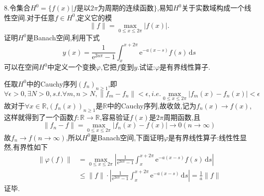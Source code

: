 \documentclass[titlepage,11pt,a4paper,twoside]{report}
\makeatletter
\newcommand\diff{\,\mathrm{d}}
\newcommand\e{\mathrm{e}}
\renewenvironment{proof}{\par
	\pushQED{\qed}%
	\normalfont \topsep1\p@\@plus6\p@\relax
	\trivlist
	\item\relax
	{\hspace*{\parindent}{\heiti 证明}\@addpunct{:}}\hspace\labelsep\ignorespaces
}{%
	\popQED\endtrivlist\@endpefalse
}
\makeatother
\begin{document}
8.令集合$H^0=\{f(x)|f\mbox{是以}2\pi\mbox{为周期的连续函数}\}$,易知$H^0$关于实数域构成一个线性空间.对于任意$f\in H^0$,定义它的模
\[\|f\|=\max_{0\leq x\leq 2\pi}|f(x)|.\]
证明$H^0$是Banach空间,利用下式
\[y(x)=\frac{1}{\e^{2a\pi}-1}\int_x^{x+2\pi}\e^{-a(x-s)}f(s)\diff s\]
可以在空间$H^0$中定义一个变换$\varphi$,它把$f$变到$y$.试证:$\varphi$是有界线性算子.
\begin{proof}任取$H^0$中的Cauchy序列$(f_n)_{n\geq1}$,即
\[\forall\epsilon>0,\exists N>0,s.t.\forall m,n>N,\|f_m-f_n\|<\epsilon,i.e.\max_{0\leq x\leq2\pi}|f_m(x)-f_n(x)|<\epsilon\]
故对于$\forall x\in\mathbb{R}$,$\left(f_n(x)\right)_{n\geq1}$是$\mathbb{R}$中的Cauchy序列,故收敛,记为$f_n(x)\to f(x)$,这样就得到了一个函数$f:\mathbb{R}\to\mathbb{R}$,容易验证$f(x)$是$2\pi$周期函数,且
\[\|f_n-f\|=\max_{0\leq x\leq2\pi}|f_n(x)-f(x)|\to0(n\to\infty)\]
故$f_n\to f(n\to\infty)$,所以$H^0$是Banach空间,下面证明$\varphi$是有界线性算子:线性性显然,有界性如下
\[\begin{split}
\|\varphi(f)\|
&=\max_{0\leq x\leq2\pi}\left|\frac{1}{\e^{2a\pi}-1}\int_x^{x+2\pi}\e^{-a(x-s)}f(s)\diff s\right|\\
&\leq\|f\|\cdot\left|\frac{1}{\e^{2a\pi}-1}\int_x^{x+2\pi}\e^{-a(x-s)}\diff s\right|=\frac{1}{a}\|f\|
\end{split}\]
证毕.
\end{proof}
\end{document}

